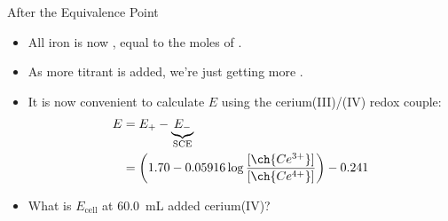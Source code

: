 \documentclass[notes=show]{beamer}
\begin{document}
\begin{frame}{After the Equivalence Point}
	\begin{itemize}
		\item All iron is now , equal to the moles of
			.
		\item As more titrant is added, we're just getting more
			.
		\item It is now convenient to calculate $E$ using the
			cerium(III)/(IV) redox couple:
			\begin{align*}
				E &= E_+ -
				\underbrace{E_-}_{\mathclap{\text{SCE}}} \\
				&= \left( 1.70 - 0.05916 \log
				\frac{[\ch{Ce^{3+}}]}{[\ch{Ce^{4+}}]} \right) -
				0.241
			\end{align*}
		\item What is $E_\text{cell}$ at \SI{60.0}{\milli\liter} added
			cerium(IV)?
	\end{itemize}


\end{frame}
\end{document}
